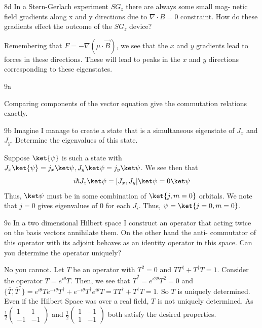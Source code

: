 \documentclass[12pt]{article}
\begin{document}
\begin{exc}{8d}
In a Stern-Gerlach experiment $SG_z$ there are always some small mag-
netic field gradients along x and y directions due to $\nabla \cdot B = 0$ constraint.
How do these gradients effect the outcome of the $SG_z$ device?
\end{exc}
\begin{ans}
    Remembering that $F = -\nabla (\mu \cdot \vec B)$, we see that the $x$ and $y$ gradients lead to forces in these directions. These will lead to peaks in the $x$ and $y$ directions corresponding to these eigenstates.
\end{ans}
\newpage 
\begin{exc}{9a}

\end{exc}
\begin{ans}
Comparing components of the vector equation give the commutation relations exactly.
\end{ans}
\begin{exc}{9b}
Imagine I manage to create a state that is a simultaneous eigenstate of
$J_x$ and $J_y$. Determine the eigenvalues of this state.
\end{exc}
\begin{ans}
Suppose $\ket{\psi}$ is such a state with $J_x \ket{\psi} = j_x \ket \psi, J_y \ket \psi = j_y \ket \psi$. We see then that 
\[i\hbar J_z \ket \psi = [J_x, J_y]\ket\psi = 0\ket\psi\]
Thus, $\ket\psi$ must be in some combination of $\ket{j, m = 0}$ orbitals. We note that $j = 0$ gives eigenvalues of $0$ for each $J_i$. Thus, $\psi = \ket{j = 0,m = 0}$.
\end{ans}
\begin{exc}{9c}
In a two dimensional Hilbert space I construct an operator that acting
twice on the basis vectors annihilate them. On the other hand the anti-
commutator of this operator with its adjoint behaves     as an identity
operator in this space. Can you determine the operator uniquely?
\end{exc}
\begin{ans}
No you cannot. Let $T$ be an operator with $T^2 = 0$ and $TT^\dagger + T^\dagger T = 1$. Consider the operator $\overline T = e^{i\theta}T$. Then, we see that $\overline T^2 = e^{i2\theta}T^2 = 0$ and $\{\overline T, \overline{T}^\dagger\} = e^{i\theta}T e^{-i\theta}T^\dagger + e^{-i\theta}T^\dagger e^{i\theta}T = TT^\dagger + T^\dagger T = 1$. So $T$ is uniquely determined. Even if the Hilbert Space was over a real field, $T$ is not uniquely determined. As $\frac12\begin{pmatrix}
    1 & 1 \\ 
    -1 & -1
\end{pmatrix}$ and $\frac12\begin{pmatrix}
    1 & -1 \\ 
    1 & -1
\end{pmatrix}$ both satisfy the desired properties.
\end{ans}
\end{document}
